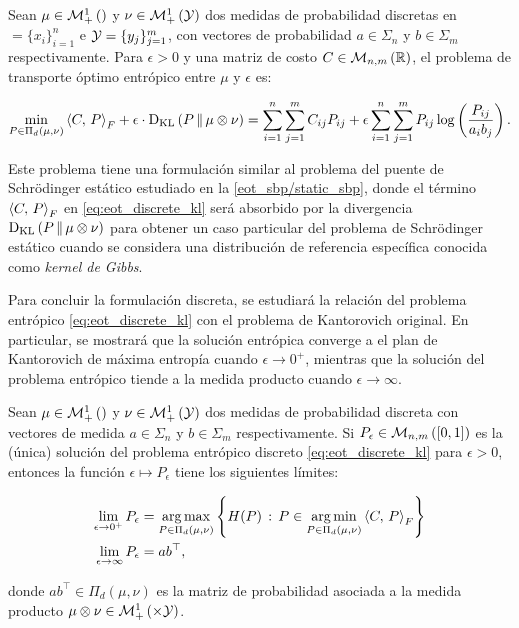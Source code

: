 \begin{defn}
	\label{defn:eot_discrete}
	Sean $\mu\in\mathcal{M}_+^1\left(\right)$ y $\nu\in\mathcal{M}_+^1\left(\mathcal{Y}\right)$ dos medidas de probabilidad discretas en $\xspace=\{x_i\}_{i=1}^n$ e $\mathcal{Y}=\{y_j\}_{j=1}^m$, con vectores de probabilidad $a\in\Sigma_n$ y $b\in\Sigma_m$ respectivamente. Para $\epsilon>0$ y una matriz de costo $C\in\mathcal{M}_{n,m}\left(\mathbb{R}\right)$, el problema de transporte óptimo entrópico entre $\mu$ y $\epsilon$ es:

	\begin{equation}
		\label{eq:eot_discrete_kl}
		\min_{P\in\Pi_d(\mu,\nu)} \left\langle C,\,P\right\rangle_F + \epsilon \cdot\operatorname{D_{KL}}\left(P\,\|\,\mu\otimes\nu\right)
		= \sum_{i=1}^n\sum_{j=1}^m C_{ij}P_{ij} + \epsilon \sum_{i=1}^n\sum_{j=1}^m P_{ij}\log\left(\frac{P_{ij}}{a_ib_j}\right).
	\end{equation}
\end{defn}

Este problema tiene una formulación similar al problema del puente de Schrödinger estático estudiado en la \autoref{eot_sbp/static_sbp}, donde el término $\left\langle C,\,P\right\rangle_F$ en \eqref{eq:eot_discrete_kl} será absorbido por la divergencia $\operatorname{D_{KL}}\left(P\,\|\,\mu\otimes\nu\right)$ para obtener un caso particular del problema de Schrödinger estático cuando se considera una distribución de referencia específica conocida como \textit{kernel de Gibbs}.

Para concluir la formulación discreta, se estudiará la relación del problema entrópico \eqref{eq:eot_discrete_kl} con el problema de Kantorovich original. En particular, se mostrará que la solución entrópica converge a el plan de Kantorovich de máxima entropía cuando $\epsilon\to 0^+$, mientras que la solución del problema entrópico tiende a la medida producto cuando $\epsilon\to\infty$.

\begin{prop}
	\label{prop:eot_convergence}
	Sean $\mu\in\mathcal{M}_+^1\left(\right)$ y $\nu\in\mathcal{M}_+^1\left(\mathcal{Y}\right)$ dos medidas de probabilidad discreta con vectores de medida $a\in\Sigma_n$ y $b\in\Sigma_m$ respectivamente. Si $P_\epsilon\in\mathcal{M}_{n,m}\left([0,1]\right)$ es la (única) solución del problema entrópico discreto \eqref{eq:eot_discrete_kl} para $\epsilon>0$, entonces la función $\epsilon\mapsto P_\epsilon$ tiene los siguientes límites:

	\begin{align*}
		\lim_{\epsilon\to 0^+} P_\epsilon    & = \operatorname*{arg\,max}_{P\in\Pi_d(\mu,\nu)} \left\{H(P)\,:\, P\in  \operatorname*{arg\,min}_{P\in\Pi_d(\mu,\nu)} \left\langle C,\,P\right\rangle_F   \right\} \\
		\lim_{\epsilon\to \infty} P_\epsilon & = ab^\top ,
	\end{align*}

	donde $ab^\top\in\Pi_d(\mu,\nu)$ es la matriz de probabilidad asociada a la medida producto $\mu\otimes\nu\in\probmeasure{\xspace\times\yspace}$.
\end{prop}

